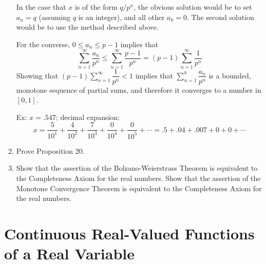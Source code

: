 \begin{enumerate}
	In the case that $x$ is of the form $q/p^n$, the obvious solution would be to set $a_n =q$ (assuming $q$ is an integer), and all other $a_k=0$.
	The second solution would be to use the method described above.\par
	For the converse,  $0\le a_n \le p-1$ implies that 
	\[
		\sum_{n=1}^\infty\dfrac{a_n}{p^n} \le \sum_{n=1}^\infty\dfrac{p-1}{p^n}=(p-1)\sum_{n=1}^\infty\dfrac{1}{p^n}
	\]
	Showing that $(p-1)\sum_{n=1}^\infty\dfrac{1}{p^n} <1$ implies that $\sum_{n=1}^k\dfrac{a_n}{p^n}$ is a bounded, monotone sequence of partial sums, and therefore it converges to a number in $[0,1]$.\par
	\par
	Ex: $x=.547$; decimal expansion: \[x=\frac{5}{10^1}+\frac{4}{10^2}+\frac{7}{10^3}+\frac{0}{10^4}+\frac{0}{10^5}+\cdots=.5+.04+.007+0+0+\cdots\]
	\item Prove Proposition 20.
	\item Show that the assertion of the Bolzano-Weierstrass Theorem is equivalent to the Completeness Axiom for the real numbers. Show that the assertion of the Monotone Convergence Theorem is equivalent to the Completeness Axiom for the real numbers.
\end{enumerate}

\section{Continuous Real-Valued Functions of a Real Variable}

